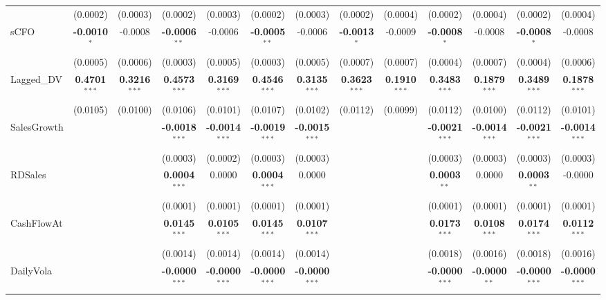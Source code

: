 \documentclass[11pt,a4paper]{article}
\begin{document}
\begin{table}[htbp]
\begin{tabular}{lcccccccccccc}
 & (0.0002) & (0.0003) & (0.0002) & (0.0003) & (0.0002) & (0.0003) & (0.0002) & (0.0004) & (0.0002) & (0.0004) & (0.0002) & (0.0004) \\
sCFO & \textbf{-0.0010}$^{*}$ & -0.0008 & \textbf{-0.0006}$^{**}$ & -0.0006 & \textbf{-0.0005}$^{**}$ & -0.0006 & \textbf{-0.0013}$^{*}$ & -0.0009 & \textbf{-0.0008}$^{*}$ & -0.0008 & \textbf{-0.0008}$^{*}$ & -0.0008 \\
 & (0.0005) & (0.0006) & (0.0003) & (0.0005) & (0.0003) & (0.0005) & (0.0007) & (0.0007) & (0.0004) & (0.0007) & (0.0004) & (0.0006) \\
Lagged\_DV & \textbf{0.4701}$^{***}$ & \textbf{0.3216}$^{***}$ & \textbf{0.4573}$^{***}$ & \textbf{0.3169}$^{***}$ & \textbf{0.4546}$^{***}$ & \textbf{0.3135}$^{***}$ & \textbf{0.3623}$^{***}$ & \textbf{0.1910}$^{***}$ & \textbf{0.3483}$^{***}$ & \textbf{0.1879}$^{***}$ & \textbf{0.3489}$^{***}$ & \textbf{0.1878}$^{***}$ \\
 & (0.0105) & (0.0100) & (0.0106) & (0.0101) & (0.0107) & (0.0102) & (0.0112) & (0.0099) & (0.0112) & (0.0100) & (0.0112) & (0.0101) \\
SalesGrowth &  &  & \textbf{-0.0018}$^{***}$ & \textbf{-0.0014}$^{***}$ & \textbf{-0.0019}$^{***}$ & \textbf{-0.0015}$^{***}$ &  &  & \textbf{-0.0021}$^{***}$ & \textbf{-0.0014}$^{***}$ & \textbf{-0.0021}$^{***}$ & \textbf{-0.0014}$^{***}$ \\
 &  &  & (0.0003) & (0.0002) & (0.0003) & (0.0003) &  &  & (0.0003) & (0.0003) & (0.0003) & (0.0003) \\
RDSales &  &  & \textbf{0.0004}$^{***}$ & 0.0000 & \textbf{0.0004}$^{***}$ & 0.0000 &  &  & \textbf{0.0003}$^{**}$ & 0.0000 & \textbf{0.0003}$^{**}$ & -0.0000 \\
 &  &  & (0.0001) & (0.0001) & (0.0001) & (0.0001) &  &  & (0.0001) & (0.0001) & (0.0001) & (0.0001) \\
CashFlowAt &  &  & \textbf{0.0145}$^{***}$ & \textbf{0.0105}$^{***}$ & \textbf{0.0145}$^{***}$ & \textbf{0.0107}$^{***}$ &  &  & \textbf{0.0173}$^{***}$ & \textbf{0.0108}$^{***}$ & \textbf{0.0174}$^{***}$ & \textbf{0.0112}$^{***}$ \\
 &  &  & (0.0014) & (0.0014) & (0.0014) & (0.0014) &  &  & (0.0018) & (0.0016) & (0.0018) & (0.0016) \\
DailyVola &  &  & \textbf{-0.0000}$^{***}$ & \textbf{-0.0000}$^{***}$ & \textbf{-0.0000}$^{***}$ & \textbf{-0.0000}$^{***}$ &  &  & \textbf{-0.0000}$^{***}$ & \textbf{-0.0000}$^{**}$ & \textbf{-0.0000}$^{***}$ & \textbf{-0.0000}$^{***}$ \\

\end{tabular}
\end{table}
\end{document}
